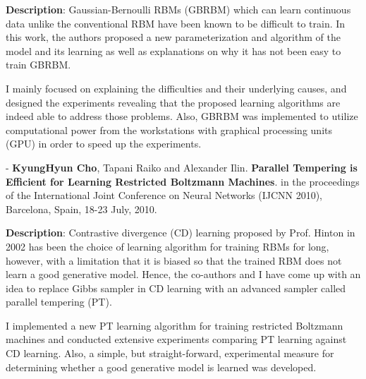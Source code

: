 \documentclass[11pt, oneside]{essay}
\begin{document}
\begin{center}
\begin{minipage}{0.93\textwidth}

\setlength{\parindent}{0pt}
\setlength{\parskip}{2ex plus 0.5ex minus 0.2ex}

\textbf{Description}:
Gaussian-Bernoulli RBMs (GBRBM) which can learn continuous
data unlike the conventional RBM have been known to be
difficult to train. In this work, the authors proposed a new
parameterization and algorithm of the model and its learning
as well as explanations on why it has not been easy to train
GBRBM.

I mainly focused on explaining the difficulties and their
underlying causes, and designed the experiments revealing
that the proposed learning algorithms are indeed able to
address those problems. Also, GBRBM was implemented to
utilize computational power from the workstations with
graphical processing units (GPU) in order to speed up the
experiments.

\end{minipage}
\end{center}

\vspace{5mm}
\newpage

- \textbf{KyungHyun Cho}, Tapani Raiko and Alexander Ilin.
\textbf{Parallel Tempering is Efficient for Learning
Restricted Boltzmann Machines}.
in the proceedings of the International Joint Conference on
Neural Networks (IJCNN 2010), Barcelona, Spain, 18-23 July,
2010.


\begin{center}
\begin{minipage}{0.93\textwidth}

\setlength{\parindent}{0pt}
\setlength{\parskip}{2ex plus 0.5ex minus 0.2ex}

\textbf{Description}:
Contrastive divergence (CD) learning proposed by Prof.
Hinton in 2002 has been the choice of learning algorithm for
training RBMs for long, however, with a limitation that it
is biased so that the trained RBM does not learn a good
generative model. Hence, the co-authors and I have come up
with an idea to replace Gibbs sampler in CD learning with an
advanced sampler called parallel tempering (PT). 

I implemented a new PT learning algorithm for training
restricted Boltzmann machines and conducted extensive
experiments comparing PT learning against CD learning. Also,
a simple, but straight-forward, experimental measure for
determining whether a good generative model is learned was
developed.

\end{minipage}
\end{center}
\end{document}
